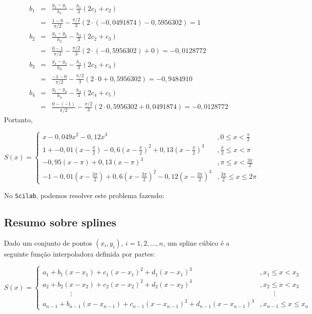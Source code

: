 \begin{eqnarray*}
b_1&=& \frac{y_{2}-y_1}{h_1}-\frac{h_1}{3}(2c_1+c_{2})\\
&=&\frac{1-0}{\pi/2}-\frac{\pi/2}{3}(2\cdot (-0,0491874)-0,5956302)=1\\
b_2&=&\frac{y_{3}-y_2}{h_2}-\frac{h_2}{3}(2c_2+c_{3})\\
&=&\frac{0-1}{\pi/2}-\frac{\pi/2}{3}(2\cdot(-0,5956302) +0)=-0,0128772\\
b_3&=&\frac{y_{4}-y_3}{h_3}-\frac{h_3}{3}(2c_3+c_{4})\\
&=&\frac{-1-0}{\pi/2}-\frac{\pi/2}{3}(2\cdot 0+0,5956302)=-0,9484910\\
b_4&=&\frac{y_{5}-y_4}{h_4}-\frac{h_4}{3}(2c_4+c_{5})\\
&=&\frac{0-(-1)}{\pi/2}-\frac{\pi/2}{3}(2\cdot 0,5956302+0,0491874)=-0,0128772
\end{eqnarray*}
Portanto,
\begin{small}
\begin{equation*}
S(x)=\left\{\begin{array}{ll}
x-0,049x^2-0,12x^3&, 0\leq x<\frac{\pi}{2}\\
1+-0,01(x-\frac{\pi}{2})-0,6(x-\frac{\pi}{2})^2+0,13(x-\frac{\pi}{2})^3&, \frac{\pi}{2}\leq x<\pi\\
-0,95(x-\pi)+0,13(x-\pi)^3&, \pi\leq x<\frac{3\pi}{2}\\
-1-0,01(x-\frac{3\pi}{2})+0,6(x-\frac{3\pi}{2})^2-0,12(x-\frac{3\pi}{2})^3&, \frac{3\pi}{2}\leq x\leq2\pi
\end{array}\right.
\end{equation*}  
\end{small}

\ifisscilab
No \verb+Scilab+, podemos resolver este problema fazendo:

\fi

\subsection{Resumo sobre splines}

Dado um conjunto de pontos $(x_i,y_i)$, $i=1,2,\ldots,n$, um spline cúbico é a seguinte função interpoladora definida por partes:
\begin{small}
\begin{equation*}
  S(x) \!=\! \left\{\begin{array}{ll}
       \!\!\!a_1 \!+\! b_1(x\!-\!x_1) \!+\! c_1(x\!-\!x_1)^2 \!+\! d_1(x\!-\!x_1)^3 &\!\!\!\!\!, x_1\leq x < x_2\\
      \!\!\!a_2 \!+\! b_2(x\!-\!x_2) \!+\! c_2(x\!-\!x_2)^2 \!+\! d_2(x\!-\!x_2)^3 &\!\!\!\!\!, x_2 \leq x < x_3\\
      \qquad\qquad \vdots & \qquad\vdots \\
      \!\!\!a_{n-1} \!+\! b_{n-1}(x\!-\!x_{n-1}) \!+\! c_{n-1}(x\!-\!x_{n-1})^2 \!+\! d_{n-1}(x\!-\!x_{n-1})^3 &\!\!\!\!\!, x_{n-1} \leq x \leq x_n \end{array}\right.
\end{equation*}
\end{small}


